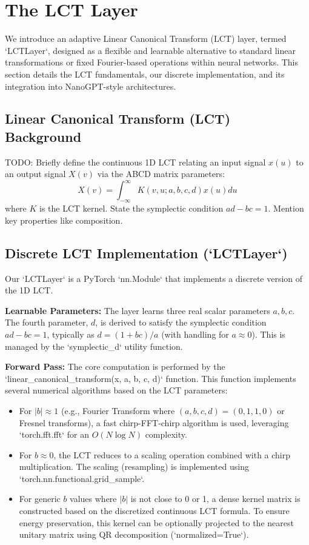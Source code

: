 \section{The \textsc{LCT} Layer}
\label{sec:method}

We introduce an adaptive Linear Canonical Transform (LCT) layer, termed `LCTLayer`, designed as a flexible and learnable alternative to standard linear transformations or fixed Fourier-based operations within neural networks. This section details the LCT fundamentals, our discrete implementation, and its integration into NanoGPT-style architectures.

\subsection{Linear Canonical Transform (LCT) Background}
TODO: Briefly define the continuous 1D LCT relating an input signal \(x(u)\) to an output signal \(X(v)\) via the ABCD matrix parameters:
\[ X(v) = \int_{-\infty}^{\infty} K(v, u; a, b, c, d) x(u) du \]
where \(K\) is the LCT kernel. State the symplectic condition \(ad - bc = 1\). Mention key properties like composition.

\subsection{Discrete \textsc{LCT} Implementation (`LCTLayer`)}
Our `LCTLayer` is a PyTorch `nn.Module` that implements a discrete version of the 1D LCT.

\textbf{Learnable Parameters:} The layer learns three real scalar parameters \(a, b, c\). The fourth parameter, \(d\), is derived to satisfy the symplectic condition \(ad-bc=1\), typically as \(d = (1+bc)/a\) (with handling for \(a \approx 0\)). This is managed by the `symplectic_d` utility function.

\textbf{Forward Pass:} The core computation is performed by the `linear_canonical_transform(x, a, b, c, d)` function. This function implements several numerical algorithms based on the LCT parameters:
\begin{itemize}
  \item For \(|b| \approx 1\) (e.g., Fourier Transform where \((a,b,c,d)=(0,1,1,0)\) or Fresnel transforms), a fast chirp-FFT-chirp algorithm is used, leveraging `torch.fft.fft` for an \(O(N \log N)\) complexity.
  \item For \(b \approx 0\), the LCT reduces to a scaling operation combined with a chirp multiplication. The scaling (resampling) is implemented using `torch.nn.functional.grid_sample`.
  \item For generic \(b\) values where \(|b|\) is not close to 0 or 1, a dense kernel matrix is constructed based on the discretized continuous LCT formula. To ensure energy preservation, this kernel can be optionally projected to the nearest unitary matrix using QR decomposition (`normalized=True`).
\end{itemize}

